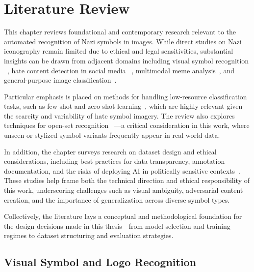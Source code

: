 
\chapter{Literature Review}\label{chapter:literature-review}

This chapter reviews foundational and contemporary research relevant to the automated recognition of Nazi symbols in
images. While direct studies on Nazi iconography remain limited due to ethical and legal sensitivities, substantial
insights can be drawn from adjacent domains including visual symbol recognition
~\parencite{krizhevsky2012imagenet,iandola2015deeplogo}, hate content detection in social media
~\parencite{belete2025200258,dasbhattacharjee2019365}, multimodal meme analysis~\parencite{scrivens2021dangerous},
and general-purpose image classification~\parencite{dosovitskiy2020image}.

Particular emphasis is placed on methods for handling low-resource classification tasks, such as few-shot and
zero-shot learning~\parencite{radford2021clip,zhang2021language}, which are highly relevant given the scarcity and
variability of hate symbol imagery. The review also explores techniques for open-set recognition
~\parencite{tuzko2020open}—a critical consideration in this work, where unseen or stylized symbol variants
frequently appear in real-world data.

In addition, the chapter surveys research on dataset design and ethical considerations, including best practices for
data transparency, annotation documentation, and the risks of deploying AI in politically sensitive
contexts~\parencite{gebru2021datasheets,ieee2021ethics}. These studies help frame both the technical direction and
ethical responsibility of this work, underscoring challenges such as visual ambiguity, adversarial content creation,
and the importance of generalization across diverse symbol types.

Collectively, the literature lays a conceptual and methodological foundation for the design decisions made in this
thesis—from model selection and training regimes to dataset structuring and evaluation strategies.

\section{Visual Symbol and Logo Recognition}

